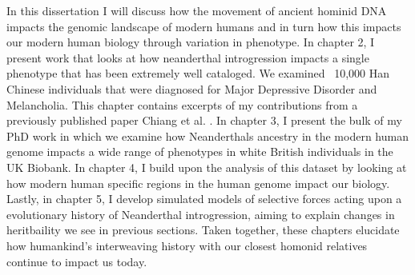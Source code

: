 In this dissertation I will discuss how the movement of ancient hominid DNA impacts the genomic landscape of modern humans and in turn how this impacts our modern human biology through variation in phenotype. In chapter 2, I present work that looks at how neanderthal introgression impacts a single phenotype that has been extremely well cataloged. We examined ~10,000 Han Chinese individuals that were diagnosed for Major Depressive Disorder and Melancholia. This chapter contains excerpts of my contributions from a previously published paper Chiang et al. \cite{chiang2018comprehensive}. In chapter 3, I present the bulk of my PhD work in which we examine how Neanderthals ancestry in the modern human genome impacts a wide range of phenotypes in white British individuals in the UK Biobank. In chapter 4, I build upon the analysis of this dataset by looking at how modern human specific regions in the human genome impact our biology. Lastly, in chapter 5, I develop simulated models of selective forces acting upon a evolutionary history of Neanderthal introgression, aiming to explain changes in heritbaility we see in previous sections. Taken together, these chapters elucidate how humankind's interweaving history with our closest homonid relatives continue to impact us today.




